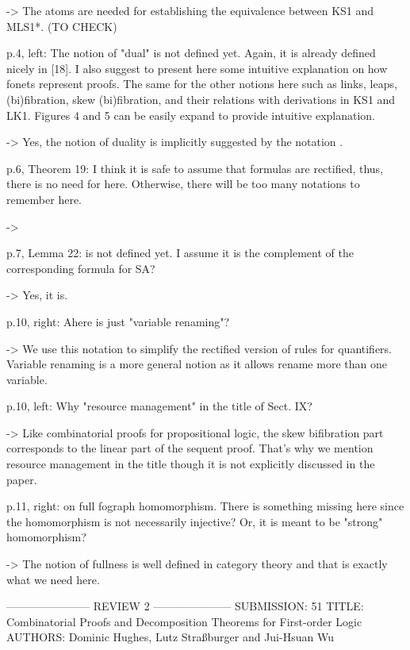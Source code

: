 -> The atoms are needed for establishing the equivalence between KS1 and MLS1*.
(TO CHECK)

p.4, left: The notion of "dual" is not defined yet.
Again, it is already defined nicely in [18].
I also suggest to present here some intuitive explanation on how fonets represent proofs.
The same for the other notions here such as links, leaps, (bi)fibration, skew (bi)fibration, and their relations with derivations in KS1 and LK1.
Figures 4 and 5 can be easily expand to provide intuitive explanation.

-> Yes, the notion of duality is implicitly suggested by the notation
.

p.6, Theorem 19: I think it is safe to assume that formulas are rectified, thus, there is no need for  here.
Otherwise, there will be too many notations to remember here.

-> 

p.7, Lemma 22:  is not defined yet.
I assume it is the complement of the corresponding formula for S{A}?

-> Yes, it is.

p.10, right: A\cdot here is just "variable renaming"?

-> We use this notation to simplify the rectified version of rules for
quantifiers. Variable renaming is a more general notion as it allows rename more
than one variable.

p.10, left: Why "resource management" in the title of Sect. IX?

-> Like combinatorial proofs for propositional logic, the skew bifibration part
corresponds to the linear part of the sequent proof. That's why we mention
resource management in the title though it is not explicitly discussed in the
paper.

p.11, right: on full fograph homomorphism.
There is something missing here since the homomorphism is not necessarily injective?
Or, it is meant to be "strong" homomorphism?

-> The notion of fullness is well defined in category theory and that is exactly
what we need here.

----------------------- REVIEW 2 ---------------------
SUBMISSION: 51
TITLE: Combinatorial Proofs and Decomposition Theorems for First-order Logic
AUTHORS: Dominic Hughes, Lutz Straßburger and Jui-Hsuan Wu

